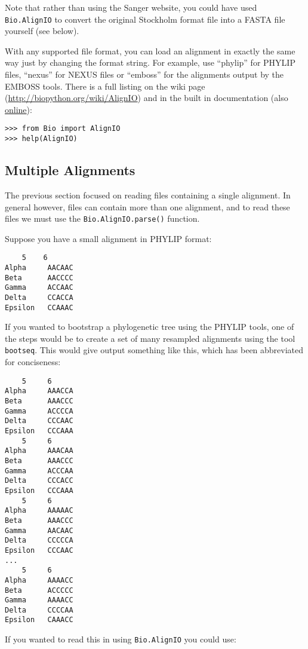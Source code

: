 Note that rather than using the Sanger website, you could have used \verb|Bio.AlignIO| to convert the original Stockholm format file into a FASTA file yourself (see below).

With any supported file format, you can load an alignment in exactly the same way just by changing the format string.  For example, use ``phylip'' for PHYLIP files, ``nexus'' for NEXUS files or ``emboss'' for the alignments output by the EMBOSS tools.  There is a full listing on the wiki page (\url{http://biopython.org/wiki/AlignIO}) and in the built in documentation (also \href{http://biopython.org/docs/\bpversion/api/Bio.AlignIO.html}{online}):

\begin{verbatim}
>>> from Bio import AlignIO
>>> help(AlignIO)
\end{verbatim}

\subsection{Multiple Alignments}

The previous section focused on reading files containing a single alignment.  In general however, files can contain more than one alignment, and to read these files we must use the \verb|Bio.AlignIO.parse()| function.

Suppose you have a small alignment in PHYLIP format:

\begin{verbatim}
    5    6
Alpha     AACAAC
Beta      AACCCC
Gamma     ACCAAC
Delta     CCACCA
Epsilon   CCAAAC
\end{verbatim}

If you wanted to bootstrap a phylogenetic tree using the PHYLIP tools, one of the steps would be to create a set of many resampled alignments using the tool \verb|bootseq|.  This would give output something like this, which has been abbreviated for conciseness:

\begin{verbatim}
    5     6
Alpha     AAACCA
Beta      AAACCC
Gamma     ACCCCA
Delta     CCCAAC
Epsilon   CCCAAA
    5     6
Alpha     AAACAA
Beta      AAACCC
Gamma     ACCCAA
Delta     CCCACC
Epsilon   CCCAAA
    5     6
Alpha     AAAAAC
Beta      AAACCC
Gamma     AACAAC
Delta     CCCCCA
Epsilon   CCCAAC
...
    5     6
Alpha     AAAACC
Beta      ACCCCC
Gamma     AAAACC
Delta     CCCCAA
Epsilon   CAAACC
\end{verbatim}

If you wanted to read this in using \verb|Bio.AlignIO| you could use:

